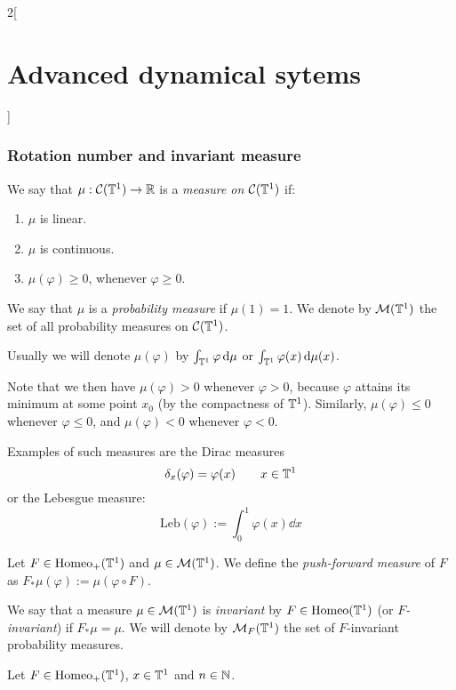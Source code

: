 \documentclass[../../../main_math.tex]{subfiles}
\begin{document}
\begin{multicols}{2}[\section{Advanced dynamical sytems}]
  \subsubsection{Rotation number and invariant measure}
  \begin{definition}
    We say that $\mu:\mathcal{C}(\mathbb{T}^1)\to\mathbb{R}$ is a \emph{measure on $\mathcal{C}(\mathbb{T}^1)$} if:
    \begin{enumerate}
      \item $\mu$ is linear.
      \item $\mu$ is continuous.
      \item $\mu(\varphi)\geq 0$, whenever $\varphi\geq 0$.
    \end{enumerate}
    We say that $\mu$ is a \emph{probability measure} if $\mu(1)=1$. We denote by $\mathcal{M}(\mathbb{T}^1)$ the set of all probability measures on $\mathcal{C}(\mathbb{T}^1)$.
  \end{definition}
  \begin{remark}
    Usually we will denote $\mu(\varphi)$ by $\int_{\mathbb{T}^1}\varphi\dd{\mu}$ or $\int_{\mathbb{T}^1}\varphi(x)\dd{\mu(x)}$.
  \end{remark}
  \begin{remark}
    Note that we then have $\mu(\varphi)>0$ whenever $\varphi>0$, because $\varphi$ attains its minimum at some point $x_0$ (by the compactness of $\mathbb{T}^1$). Similarly, $\mu(\varphi)\leq 0$ whenever $\varphi\leq 0$, and $\mu(\varphi)<0$ whenever $\varphi<0$.
  \end{remark}
  \begin{remark}
    Examples of such measures are the Dirac measures
    $$\delta_x(\varphi)=\varphi(x)\qquad x\in \mathbb{T}^1$$
    or the Lebesgue measure:
    $$\text{Leb}(\varphi):=\int_{0}^1\varphi(x)\dd{x}$$
  \end{remark}
  \begin{definition}
    Let $F\in \mathrm{Homeo}_+(\mathbb{T}^1)$ and $\mu\in \mathcal{M}(\mathbb{T}^1)$. We define the \emph{push-forward measure} of $F$ as $F_*\mu(\varphi):=\mu(\varphi\circ F)$.
  \end{definition}
  \begin{definition}
    We say that a measure $\mu\in\mathcal{M}(\mathbb{T}^1)$ is \emph{invariant} by $F\in\mathrm{Homeo}(\mathbb{T}^1)$ (or \emph{$F$-invariant}) if $F_*\mu=\mu$. We will denote by $\mathcal{M}_F(\mathbb{T}^1)$ the set of $F$-invariant probability measures.
  \end{definition}
  \begin{proposition}
    Let $F\in \mathrm{Homeo}_+(\mathbb{T}^1)$, $x\in\mathbb{T}^1$ and $n\in\mathbb{N}$.

\end{proposition}
\end{multicols}
\end{document}
